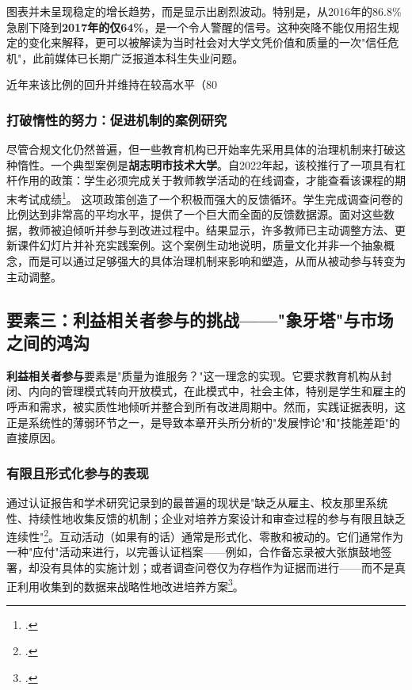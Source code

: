 图表并未呈现稳定的增长趋势，而是显示出剧烈波动。特别是，从2016年的86.8\%急剧下降到\textbf{2017年的仅64\%}，是一个令人警醒的信号。这种突降不能仅用招生规定的变化来解释，更可以被解读为当时社会对大学文凭价值和质量的一次"信任危机"，此前媒体已长期广泛报道本科生失业问题。

近年来该比例的回升并维持在较高水平（80%

\subsubsection{打破惰性的努力：促进机制的案例研究}
尽管合规文化仍然普遍，但一些教育机构已开始率先采用具体的治理机制来打破这种惰性。一个典型案例是\textbf{胡志明市技术大学}。自2022年起，该校推行了一项具有杠杆作用的政策：学生必须完成关于教师教学活动的在线调查，才能查看该课程的期末考试成绩\footcite{hutech_khao_sat_2022}。
这项政策创造了一个积极而强大的反馈循环。学生完成调查问卷的比例达到非常高的平均水平，提供了一个巨大而全面的反馈数据源。面对这些数据，教师被迫倾听并参与到改进过程中。结果显示，许多教师已主动调整方法、更新课件幻灯片并补充实践案例。这个案例生动地说明，质量文化并非一个抽象概念，而是可以通过足够强大的具体治理机制来影响和塑造，从而从被动参与转变为主动调整。





\subsection{要素三：利益相关者参与的挑战——"象牙塔"与市场之间的鸿沟}
\label{subsec:thach_thuc_lienquan}

\textbf{利益相关者参与}要素是"质量为谁服务？"这一理念的实现。它要求教育机构从封闭、内向的管理模式转向开放模式，在此模式中，社会主体，特别是学生和雇主的呼声和需求，被实质性地倾听并整合到所有改进周期中。然而，实践证据表明，这正是系统性的薄弱环节之一，是导致本章开头所分析的"发展悖论"和"技能差距"的直接原因。

\subsubsection{有限且形式化参与的表现}
通过认证报告和学术研究记录到的最普遍的现状是"缺乏从雇主、校友那里系统性、持续性地收集反馈的机制；企业对培养方案设计和审查过程的参与有限且缺乏连续性"\footcite{vnujs_er_2018}。互动活动（如果有的话）通常是形式化、零散和被动的。它们通常作为一种"应付"活动来进行，以完善认证档案——例如，合作备忘录被大张旗鼓地签署，却没有具体的实施计划；或者调查问卷仅为存档作为证据而进行——而不是真正利用收集到的数据来战略性地改进培养方案\footcite{vje_aun_implementation_2019}。

